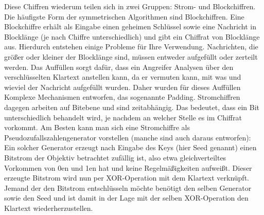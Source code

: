 \documentclass[13pt,a4paper,bibliography=totocnumbered,listof=totocnumbered]{scrartcl}
\begin{document}
Diese Chiffren wiederum teilen sich in zwei Gruppen: Strom- und Blockchiffren. Die häufigste Form der symmetrischen Algorithmen sind Blockchiffren. Eine Blockchiffre erhält als Eingabe einen geheimen Schlüssel sowie eine Nachricht in Blocklänge (je nach Chiffre unterschiedlich) und gibt ein Chiffrat von Blocklänge aus. Hierdurch entstehen einige Probleme für Ihre Verwendung. Nachrichten, die größer oder kleiner der Blocklänge sind, müssen entweder aufgefüllt oder zerteilt werden. Das Auffüllen sorgt dafür, dass ein Angreifer Analysen über den verschlüsselten Klartext anstellen kann, da er vermuten kann, mit was und wieviel der Nachricht aufgefüllt wurden. Daher wurden für dieses Auffüllen Komplexe Mechanismen entworfen, das sogenannte Padding. Stromchiffren dagegen arbeiten auf Bitebene und sind zeitabhängig. Das bedeutet, dass ein Bit unterschiedlich behandelt wird, je nachdem an welcher Stelle es im Chiffrat vorkommt. Am Besten kann man sich eine Stromchiffre als Pseudozufallszahlengenerator vorstellen (manche sind auch daraus entworfen): Ein solcher Generator erzeugt nach Eingabe des Keys (hier Seed genannt) einen Bitstrom der Objektiv betrachtet zufällig ist, also etwa gleichverteiltes Vorkommen von 0en und 1en hat und keine Regelmäßigkeiten aufweißt. Dieser erzeugte Bitstrom wird nun per XOR-Operation mit dem Klartext verknüpft. Jemand der den Bitstrom entschlüsseln möchte benötigt den selben Generator sowie den Seed und ist damit in der Lage mit der selben XOR-Operation den Klartext wiederherzustellen.\\
\cite[S. 4, 223, 249]{42} \cite[S. 22-25]{48} \cite[S. 22-24]{13}\\ 
\end{document}
